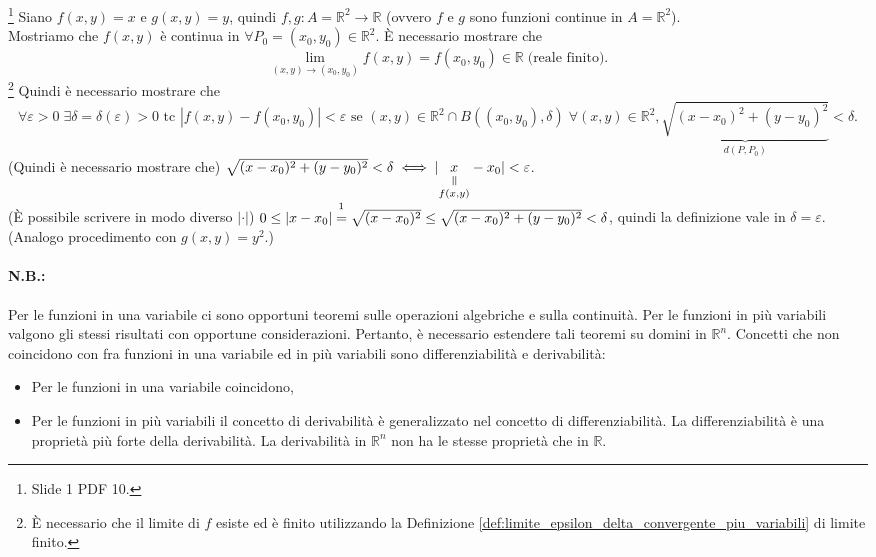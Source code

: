 \begin{example}\footnote{Slide 1 PDF 10.}
    Siano $f(x,y)=x$ e $g(x,y)=y$, quindi $f,g\colon A=\mathbb R^2\rightarrow\mathbb R$ (ovvero $f$ e $g$ sono funzioni continue in $A=\mathbb R^2$).\\
    Mostriamo che $f(x,y)$ è continua in $\forall P_0=(x_0,y_0)\in\mathbb R^2$. È necessario mostrare che
    \begin{equation*}
        \lim_{(x,y)\rightarrow(x_0,y_0)}f(x,y)=f(x_0,y_0)\in\mathbb R\; \text{(reale finito)}.
    \end{equation*}
    \footnote{È necessario che il limite di $f$ esiste ed è finito utilizzando la Definizione \ref{def:limite_epsilon_delta_convergente_piu_variabili} di limite finito.} Quindi è necessario mostrare che
    \begin{equation*}
        \forall\varepsilon>0\;\exists\delta=\delta(\varepsilon)>0 \text{ tc } |f(x,y)-f(x_0,y_0)|<\varepsilon \text{ se } (x,y)\in\mathbb R^2\cap B((x_0,y_0),\delta)\; \forall (x,y)\in\mathbb R^2, \underbrace{\sqrt{(x-x_0)^2+(y-y_0)^2}}_{d(P,P_0)}<\delta.
    \end{equation*}
    (Quindi è necessario mostrare che) $\sqrt{(x-x_0)^2+(y-y_0)^2}<\delta\iff|\equalto{x}{f(x,y)}-x_0|<\varepsilon$.\\
    (È possibile scrivere in modo diverso $|\cdot|$)  $0\leq|x-x_0|\overset{\footnotemark}{=}\sqrt{(x-x_0)^2}\leq\sqrt{(x-x_0)^2+(y-y_0)^2}<\delta$, quindi la definizione vale in $\delta=\varepsilon$.\\
    (Analogo procedimento con $g(x,y)=y^2$.)
\end{example}

\paragraph{N.B.:} Per le funzioni in una variabile ci sono opportuni teoremi sulle operazioni algebriche e sulla continuità. Per le funzioni in più variabili valgono gli stessi risultati con opportune considerazioni. Pertanto, è necessario estendere tali teoremi su domini in $\mathbb R^n$. Concetti che non coincidono con fra funzioni in una variabile ed in più variabili sono differenziabilità e derivabilità:
\begin{itemize}
    \item Per le funzioni in una variabile coincidono,
    \item Per le funzioni in più variabili il concetto di derivabilità è generalizzato nel concetto di differenziabilità. La differenziabilità è una proprietà più forte della derivabilità. La derivabilità in $\mathbb R^n$ non ha le stesse proprietà che in $\mathbb R$.
\end{itemize}

